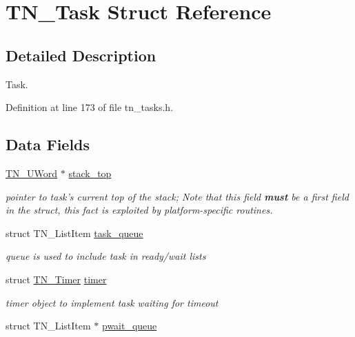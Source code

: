 \hypertarget{structTN__Task}{\section{T\+N\+\_\+\+Task Struct Reference}
\label{structTN__Task}
}


\subsection{Detailed Description}
Task. 

Definition at line 173 of file tn\+\_\+tasks.\+h.

\subsection*{Data Fields}
\begin{DoxyCompactItemize}
\item 
\hyperlink{tn__arch__example_8h_ab80cba0fe9ffcd9011d53dfeb9e39bf4}{T\+N\+\_\+\+U\+Word} $\ast$ \hyperlink{structTN__Task_a6e31948663b2846ac9dddc05f529286a}{stack\+\_\+top}
\begin{DoxyCompactList}\small\item\em pointer to task's current top of the stack; Note that this field {\bfseries must} be a first field in the struct, this fact is exploited by platform-\/specific routines. \end{DoxyCompactList}\item 
\hypertarget{structTN__Task_a0772dfcd1f95d0ba10b9d2820fb9201b}{struct T\+N\+\_\+\+List\+Item \hyperlink{structTN__Task_a0772dfcd1f95d0ba10b9d2820fb9201b}{task\+\_\+queue}}\label{structTN__Task_a0772dfcd1f95d0ba10b9d2820fb9201b}

\begin{DoxyCompactList}\small\item\em queue is used to include task in ready/wait lists \end{DoxyCompactList}\item 
\hypertarget{structTN__Task_ac394d7ba177bab077969e9d96cddd8fb}{struct \hyperlink{structTN__Timer}{T\+N\+\_\+\+Timer} \hyperlink{structTN__Task_ac394d7ba177bab077969e9d96cddd8fb}{timer}}\label{structTN__Task_ac394d7ba177bab077969e9d96cddd8fb}

\begin{DoxyCompactList}\small\item\em timer object to implement task waiting for timeout \end{DoxyCompactList}\item 
\hypertarget{structTN__Task_a971ab5689af53bed2548c62f3bcabdc5}{struct T\+N\+\_\+\+List\+Item $\ast$ \hyperlink{structTN__Task_a971ab5689af53bed2548c62f3bcabdc5}{pwait\+\_\+queue}}\label{structTN__Task_a971ab5689af53bed2548c62f3bcabdc5}


\end{DoxyCompactItemize}
